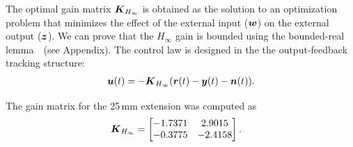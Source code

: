 The optimal gain matrix $\boldsymbol{K}_{H_{\infty}}$ is obtained as the solution to an optimization problem that minimizes the effect of the external input ($\boldsymbol{w}$) on the external output ($\boldsymbol{z}$). We can prove that the ${H_{\infty}}$ gain is bounded using the bounded-real lemma~\cite{Boyd1994}~(see Appendix). The control law is designed in the the output-feedback tracking structure: \vspace{2mm}
\begin{align}
\boldsymbol{u}(t)=-\boldsymbol{K}_{H_\infty}(\boldsymbol{r}(t)-\boldsymbol{y}(t)-\boldsymbol{n}(t)). \label{eq:Hinf-ctl}
\end{align}

The gain matrix for the 25\,mm extension %
was computed as \vspace{2mm}
\begin{align*}
\boldsymbol{K}_{H_{\infty}} &=\begin{bmatrix}  
           -1.7371  &  2.9015 \\
           -0.3775  & -2.4158  
    \end{bmatrix}.
\end{align*}


